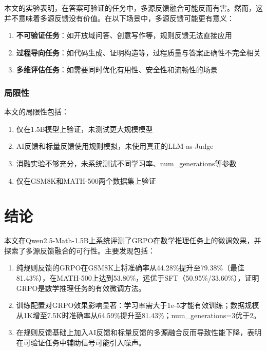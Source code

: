 \documentclass[10.5pt]{article}
\begin{document}
本文的实验表明，在答案可验证的任务中，多源反馈融合可能反而有害。然而，这并不意味着多源反馈没有价值。在以下场景中，多源反馈可能更有意义：

\begin{enumerate}[leftmargin=2em]
  \item \textbf{不可验证任务}：如开放域问答、创意写作等，规则反馈无法直接应用
  \item \textbf{过程导向任务}：如代码生成、证明构造等，过程质量与答案正确性不完全相关
  \item \textbf{多维评估任务}：如需要同时优化有用性、安全性和流畅性的场景
\end{enumerate}

\subsubsection{局限性}

本文的局限性包括：

\begin{enumerate}[leftmargin=2em]
  \item 仅在1.5B模型上验证，未测试更大规模模型
  \item AI反馈和标量反馈使用规则模拟，未使用真正的LLM-as-Judge
  \item 消融实验不够充分，未系统测试不同学习率、num\_generations等参数
  \item 仅在GSM8K和MATH-500两个数据集上验证
\end{enumerate}

\section{结论}

本文在Qwen2.5-Math-1.5B上系统评测了GRPO在数学推理任务上的微调效果，并探索了多源反馈融合的可行性。主要发现包括：

\begin{enumerate}[leftmargin=2em]
  \item 纯规则反馈的GRPO在GSM8K上将准确率从44.28\%提升至79.38\%（最佳81.43\%），在MATH-500上达到53.80\%，远优于SFT（50.95\%/33.60\%），证明GRPO是数学推理任务的有效微调方法。
  \item 训练配置对GRPO效果影响显著：学习率需大于1e-5才能有效训练；数据规模从1K增至7.5K时准确率从64.59\%提升至81.43\%；num\_generations=3优于2。
  \item 在规则反馈基础上加入AI反馈和标量反馈的多源融合反而导致性能下降，表明在可验证任务中辅助信号可能引入噪声。
\end{enumerate}
\end{document}
